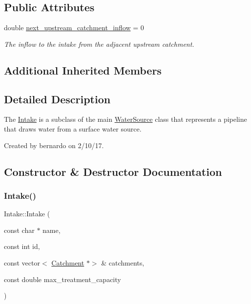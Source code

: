 \subsection*{Public Attributes}
\begin{DoxyCompactItemize}
\item 
double \mbox{\hyperlink{classIntake_a5d28f8899e9d4d61983ad8fdf7d58373}{next\+\_\+upstream\+\_\+catchment\+\_\+inflow}} = 0
\begin{DoxyCompactList}\small\item\em The inflow to the intake from the adjacent upstream catchment. \end{DoxyCompactList}\end{DoxyCompactItemize}
\subsection*{Additional Inherited Members}


\subsection{Detailed Description}
The {\ttfamily \mbox{\hyperlink{classIntake}{Intake}}} is a subclass of the main {\ttfamily \mbox{\hyperlink{classWaterSource}{Water\+Source}}} class that represents a pipeline that draws water from a surface water source. 

Created by bernardo on 2/10/17. 

\subsection{Constructor \& Destructor Documentation}
\mbox{\label{classIntake_a02e01801fcaede46e960d497e60eb335}} 
\subsubsection{\texorpdfstring{Intake()}{Intake()}\hspace{0.1cm}{\footnotesize\ttfamily [1/4]}}
{\footnotesize\ttfamily Intake\+::\+Intake (\begin{DoxyParamCaption}\item[{const char $\ast$}]{name,  }\item[{const int}]{id,  }\item[{const vector$<$ \mbox{\hyperlink{classCatchment}{Catchment}} $\ast$$>$ \&}]{catchments,  }\item[{const double}]{max\+\_\+treatment\+\_\+capacity }\end{DoxyParamCaption})}



